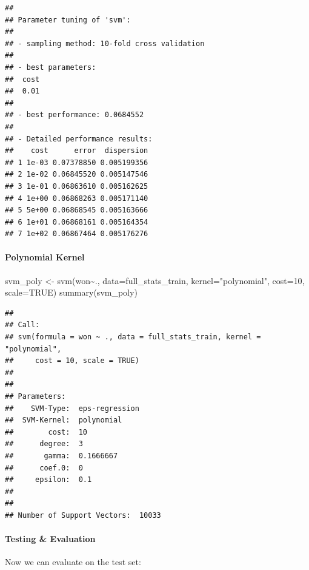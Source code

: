 \documentclass[
]{article}
\newenvironment{Shaded}{\begin{snugshade}}{\end{snugshade}}
\newcommand{\AttributeTok}[1]{\textcolor[rgb]{0.77,0.63,0.00}{#1}}
\newcommand{\ConstantTok}[1]{\textcolor[rgb]{0.00,0.00,0.00}{#1}}
\newcommand{\DecValTok}[1]{\textcolor[rgb]{0.00,0.00,0.81}{#1}}
\newcommand{\FunctionTok}[1]{\textcolor[rgb]{0.00,0.00,0.00}{#1}}
\newcommand{\NormalTok}[1]{#1}
\newcommand{\OtherTok}[1]{\textcolor[rgb]{0.56,0.35,0.01}{#1}}
\newcommand{\SpecialCharTok}[1]{\textcolor[rgb]{0.00,0.00,0.00}{#1}}
\newcommand{\StringTok}[1]{\textcolor[rgb]{0.31,0.60,0.02}{#1}}
\begin{document}
\begin{verbatim}
## 
## Parameter tuning of 'svm':
## 
## - sampling method: 10-fold cross validation 
## 
## - best parameters:
##  cost
##  0.01
## 
## - best performance: 0.0684552 
## 
## - Detailed performance results:
##    cost      error  dispersion
## 1 1e-03 0.07378850 0.005199356
## 2 1e-02 0.06845520 0.005147546
## 3 1e-01 0.06863610 0.005162625
## 4 1e+00 0.06868263 0.005171140
## 5 5e+00 0.06868545 0.005163666
## 6 1e+01 0.06868161 0.005164354
## 7 1e+02 0.06867464 0.005176276
\end{verbatim}

\hypertarget{polynomial-kernel}{%
\paragraph{Polynomial Kernel}\label{polynomial-kernel}}

\begin{Shaded}
\begin{Highlighting}[]
\NormalTok{svm\_poly }\OtherTok{\textless{}{-}} \FunctionTok{svm}\NormalTok{(won}\SpecialCharTok{\textasciitilde{}}\NormalTok{., }\AttributeTok{data=}\NormalTok{full\_stats\_train, }\AttributeTok{kernel=}\StringTok{"polynomial"}\NormalTok{, }\AttributeTok{cost=}\DecValTok{10}\NormalTok{, }\AttributeTok{scale=}\ConstantTok{TRUE}\NormalTok{)}
\FunctionTok{summary}\NormalTok{(svm\_poly)}
\end{Highlighting}
\end{Shaded}

\begin{verbatim}
## 
## Call:
## svm(formula = won ~ ., data = full_stats_train, kernel = "polynomial", 
##     cost = 10, scale = TRUE)
## 
## 
## Parameters:
##    SVM-Type:  eps-regression 
##  SVM-Kernel:  polynomial 
##        cost:  10 
##      degree:  3 
##       gamma:  0.1666667 
##      coef.0:  0 
##     epsilon:  0.1 
## 
## 
## Number of Support Vectors:  10033
\end{verbatim}

\hypertarget{testing-evaluation-1}{%
\paragraph{Testing \& Evaluation}\label{testing-evaluation-1}}

Now we can evaluate on the test set:
\end{document}
